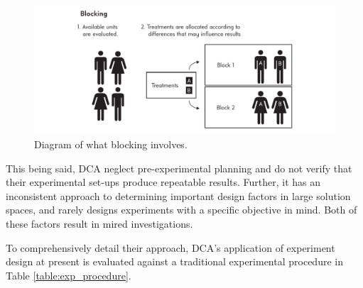 \documentclass[11pt,a4paper,article]{memoir} %
\begin{document}
\begin{figure}
\includegraphics[width=\textwidth]{Blocking.pdf}
\caption{Diagram of what blocking involves.}
\label{fig:blocking}
\end{figure}
\par
This being said, DCA neglect pre-experimental planning and do not verify that their experimental set-ups produce repeatable results. Further, it has an inconsistent approach to determining important design factors in large solution spaces, and rarely designs experiments with a specific objective in mind. Both of these factors result in mired investigations.
\par
To comprehensively detail their approach, DCA's application of experiment design at present is evaluated against a traditional experimental procedure in Table \ref{table:exp_procedure}.
\end{document}

